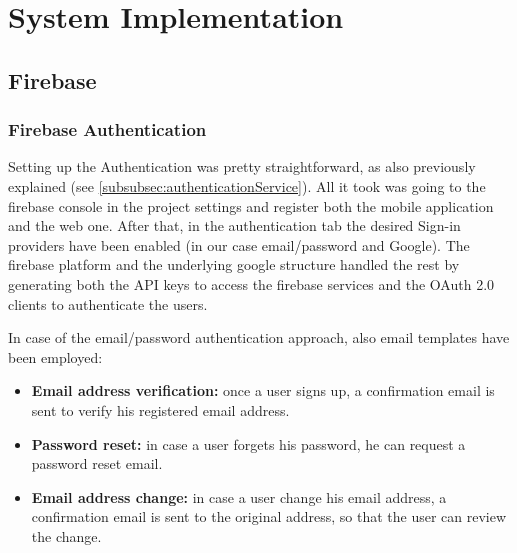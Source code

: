 \section{System Implementation}
\subsection{Firebase}
\subsubsection{Firebase Authentication}
\label{subsubsec:firebaseAuthentication}
Setting up the Authentication was pretty straightforward, as also previously explained (see \cref{subsubsec:authenticationService}). All it took was going to the firebase console in the project settings and register both the mobile application and the web one. After that, in the authentication tab the desired Sign-in providers have been enabled (in our case email/password and Google). The firebase platform and the underlying google structure handled the rest by generating both the API keys to access the firebase services and the OAuth 2.0 clients to authenticate the users.


\noindent In case of the email/password authentication approach, also email templates have been employed:
\begin{itemize}[nosep] %
    \item \textbf{Email address verification:} once a user signs up, a confirmation email is sent to verify his registered email address.
    \item \textbf{Password reset:} in case a user forgets his password, he can request a password reset email.
    \item \textbf{Email address change:} in case a user change his email address, a confirmation email is sent to the original address, so that the user can review the change.
\end{itemize}

